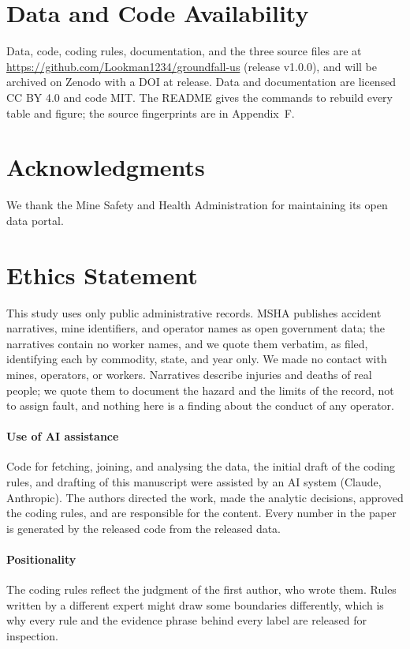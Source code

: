 \documentclass[letterpaper,twocolumn,10pt]{article}
\begin{document}
\section{Data and Code Availability}
Data, code, coding rules, documentation, and the three source files are at \url{https://github.com/Lookman1234/groundfall-us} (release v1.0.0), and will be archived on Zenodo with a DOI at release. Data and documentation are licensed CC BY 4.0 and code MIT. The README gives the commands to rebuild every table and figure; the source fingerprints are in Appendix~F.

\section{Acknowledgments}
We thank the Mine Safety and Health Administration for maintaining its open data portal.

\section{Ethics Statement}
This study uses only public administrative records. MSHA publishes accident narratives, mine identifiers, and operator names as open government data; the narratives contain no worker names, and we quote them verbatim, as filed, identifying each by commodity, state, and year only. We made no contact with mines, operators, or workers. Narratives describe injuries and deaths of real people; we quote them to document the hazard and the limits of the record, not to assign fault, and nothing here is a finding about the conduct of any operator.

\paragraph{Use of AI assistance} Code for fetching, joining, and analysing the data, the initial draft of the coding rules, and drafting of this manuscript were assisted by an AI system (Claude, Anthropic). The authors directed the work, made the analytic decisions, approved the coding rules, and are responsible for the content. Every number in the paper is generated by the released code from the released data.

\paragraph{Positionality} The coding rules reflect the judgment of the first author, who wrote them. Rules written by a different expert might draw some boundaries differently, which is why every rule and the evidence phrase behind every label are released for inspection.
\end{document}
